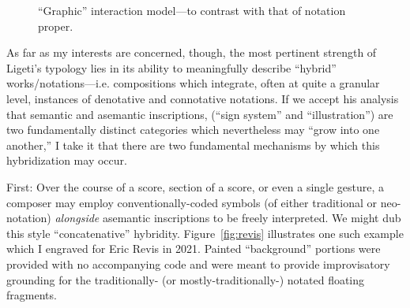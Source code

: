         \begin{figure} 
            \centering
            \captionsetup{width=.5\textwidth}
            \caption{``Graphic'' interaction model---to contrast with that of notation proper.}
            \label{fig:graphicdiagram}
        \end{figure}

        As far as my interests are concerned, though, the most pertinent strength of Ligeti's typology lies in its ability to meaningfully describe ``hybrid'' works/notations---i.e. compositions which integrate, often at quite a granular level, instances of denotative and connotative notations. If we accept his analysis that semantic and asemantic inscriptions, (``sign system'' and ``illustration'') are two fundamentally distinct categories which nevertheless may ``grow into one another,'' I take it that there are two fundamental mechanisms by which this hybridization may occur.\autocite[177]{Ligeti_1965}
 
    First: Over the course of a score, section of a score, or even a single gesture, a composer may employ conventionally-coded symbols (of either traditional or neo-notation) \textit{alongside} asemantic inscriptions to be freely interpreted. We might dub this style ``concatenative'' hybridity. Figure~\ref{fig:revis} illustrates one such example which I engraved for Eric Revis in 2021. Painted ``background'' portions were provided with no accompanying code and were meant to provide improvisatory grounding for the traditionally- (or mostly-traditionally-) notated floating fragments.

